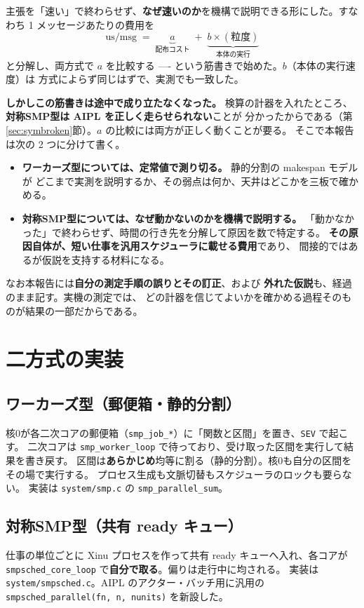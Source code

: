\documentclass[a4paper,11pt]{ltjsarticle}
\begin{document}
主張を「速い」で終わらせず、\textbf{なぜ速いのか}を機構で説明できる形にした。すなわち
1 メッセージあたりの費用を
\[
  \text{us/msg} \;=\; \underbrace{a}_{\text{配布コスト}} \;+\; \underbrace{b \times (\text{粒度})}_{\text{本体の実行}}
\]
と分解し、両方式で $a$ を比較する ---- という筋書きで始めた。$b$（本体の実行速度）は
方式によらず同じはずで、実測でも一致した。

\textbf{しかしこの筋書きは途中で成り立たなくなった。}
検算の計器を入れたところ、\textbf{対称SMP型は AIPL を正しく走らせられない}ことが
分かったからである（第\ref{sec:symbroken}節）。$a$ の比較には両方が正しく動くことが要る。
そこで本報告は次の 2 つに分けて書く。

\begin{itemize}
\item \textbf{ワーカーズ型については、定常値で測り切る。} 静的分割の makespan モデルが
      どこまで実測を説明するか、その弱点は何か、天井はどこかを三板で確かめる。
\item \textbf{対称SMP型については、なぜ動かないのかを機構で説明する。}
      「動かなかった」で終わらせず、時間の行き先を分解して原因を数で特定する。
      \textbf{その原因自体が、短い仕事を汎用スケジューラに載せる費用}であり、
      間接的ではあるが仮説を支持する材料になる。
\end{itemize}

なお本報告には\textbf{自分の測定手順の誤りとその訂正}、および
\textbf{外れた仮説}も、経過のまま記す。実機の測定では、
どの計器を信じてよいかを確かめる過程そのものが結果の一部だからである。

\section{二方式の実装}

\subsection{ワーカーズ型（郵便箱・静的分割）}
核0が各二次コアの郵便箱（\texttt{smp\_job\_*}）に「関数と区間」を置き、\texttt{SEV} で起こす。
二次コアは \texttt{smp\_worker\_loop} で待っており、受け取った区間を実行して結果を書き戻す。
区間は\textbf{あらかじめ}均等に割る（静的分割）。核0も自分の区間をその場で実行する。
プロセス生成も文脈切替もスケジューラのロックも要らない。
実装は \texttt{system/smp.c} の \texttt{smp\_parallel\_sum}。

\subsection{対称SMP型（共有 ready キュー）}
仕事の単位ごとに Xinu プロセスを作って共有 ready キューへ入れ、各コアが
\texttt{smpsched\_core\_loop} で\textbf{自分で取る}。偏りは走行中に均される。
実装は \texttt{system/smpsched.c}。AIPL のアクター・バッチ用に汎用の
\texttt{smpsched\_parallel(fn, n, nunits)} を新設した。
\end{document}
